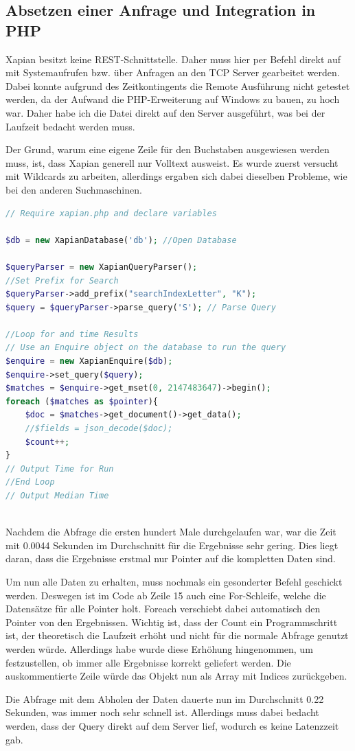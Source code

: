 \subsection{Absetzen einer Anfrage und Integration in PHP}

Xapian besitzt keine REST-Schnittstelle. Daher muss hier per Befehl direkt auf mit Systemaufrufen bzw. über Anfragen an den TCP Server gearbeitet werden. Dabei konnte aufgrund des Zeitkon­tin­gents die Remote Ausführung nicht getestet werden, da der Aufwand die PHP-Erweiterung auf Windows zu bauen, zu hoch war. Daher habe ich die Datei direkt auf den Server ausgeführt, was bei der Laufzeit bedacht werden muss. 

Der Grund, warum eine eigene Zeile für den Buchstaben ausgewiesen werden muss, ist, dass Xapian generell nur Volltext ausweist. Es wurde zuerst versucht mit Wildcards zu arbeiten, allerdings ergaben sich dabei dieselben Probleme, wie bei den anderen Suchmaschinen.

\begin{lstlisting}[language=php, frame=single, label={lst:XapPhpQuery}, 
	morekeywords={type,uninvertible,indexed,stored,field,multiValued, name}] 
// Require xapian.php and declare variables

$db = new XapianDatabase('db'); //Open Database

$queryParser = new XapianQueryParser();
//Set Prefix for Search
$queryParser->add_prefix("searchIndexLetter", "K"); 
$query = $queryParser->parse_query('S'); // Parse Query

//Loop for and time Results
// Use an Enquire object on the database to run the query
$enquire = new XapianEnquire($db);
$enquire->set_query($query);
$matches = $enquire->get_mset(0, 2147483647)->begin();
foreach ($matches as $pointer){
	$doc = $matches->get_document()->get_data();
	//$fields = json_decode($doc);
	$count++;
}
// Output Time for Run
//End Loop 
// Output Median Time
	
\end{lstlisting}

Nachdem die Abfrage die ersten hundert Male durchgelaufen war, war die Zeit mit 0.0044 Sekunden im Durchschnitt für die Ergebnisse sehr gering. Dies liegt daran, dass die Ergebnisse erstmal nur Pointer auf die kompletten Daten sind. 

Um nun alle Daten zu erhalten, muss nochmals ein gesonderter Befehl geschickt werden. Deswegen ist im Code ab Zeile 15 auch eine For-Schleife, welche die Datensätze für alle Pointer holt. Foreach verschiebt dabei automatisch den Pointer von den Ergebnissen. Wichtig ist, dass der Count ein Programmschritt ist, der theoretisch die Laufzeit erhöht und nicht für die normale Abfrage genutzt werden würde. Allerdings habe wurde diese Erhöhung hingenommen, um festzustellen, ob immer alle Ergebnisse korrekt geliefert werden.
Die auskommentierte Zeile würde das Objekt nun als Array mit Indices zurückgeben. 

Die Abfrage mit dem Abholen der Daten dauerte nun im Durchschnitt 0.22 Sekunden, was immer noch sehr schnell ist. Allerdings muss dabei bedacht werden, dass der Query direkt auf dem Server lief, wodurch es keine Latenzzeit gab.

